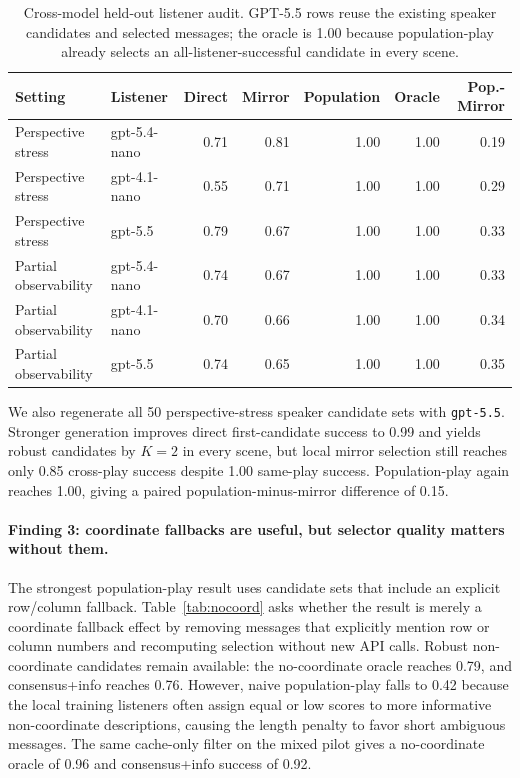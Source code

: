 \begin{table}[H]
\centering
\small
\begin{tabular}{llrrrrr}
\toprule
Setting & Listener & Direct & Mirror & Population & Oracle & Pop.-Mirror \\
\midrule
Perspective stress & gpt-5.4-nano & 0.71 & 0.81 & 1.00 & 1.00 & 0.19 \\
Perspective stress & gpt-4.1-nano & 0.55 & 0.71 & 1.00 & 1.00 & 0.29 \\
Perspective stress & gpt-5.5 & 0.79 & 0.67 & 1.00 & 1.00 & 0.33 \\
Partial observability & gpt-5.4-nano & 0.74 & 0.67 & 1.00 & 1.00 & 0.33 \\
Partial observability & gpt-4.1-nano & 0.70 & 0.66 & 1.00 & 1.00 & 0.34 \\
Partial observability & gpt-5.5 & 0.74 & 0.65 & 1.00 & 1.00 & 0.35 \\
\bottomrule
\end{tabular}
\caption{Cross-model held-out listener audit. GPT-5.5 rows reuse the existing speaker candidates and selected messages; the oracle is 1.00 because population-play already selects an all-listener-successful candidate in every scene.}
\label{tab:crossmodel}
\end{table}

We also regenerate all 50 perspective-stress speaker candidate sets with \texttt{gpt-5.5}. Stronger generation improves direct first-candidate success to 0.99 and yields robust candidates by $K=2$ in every scene, but local mirror selection still reaches only 0.85 cross-play success despite 1.00 same-play success. Population-play again reaches 1.00, giving a paired population-minus-mirror difference of 0.15.

\paragraph{Finding 3: coordinate fallbacks are useful, but selector quality matters without them.}
The strongest population-play result uses candidate sets that include an explicit row/column fallback. Table~\ref{tab:nocoord} asks whether the result is merely a coordinate fallback effect by removing messages that explicitly mention row or column numbers and recomputing selection without new API calls. Robust non-coordinate candidates remain available: the no-coordinate oracle reaches 0.79, and consensus+info reaches 0.76. However, naive population-play falls to 0.42 because the local training listeners often assign equal or low scores to more informative non-coordinate descriptions, causing the length penalty to favor short ambiguous messages. The same cache-only filter on the mixed pilot gives a no-coordinate oracle of 0.96 and consensus+info success of 0.92.

